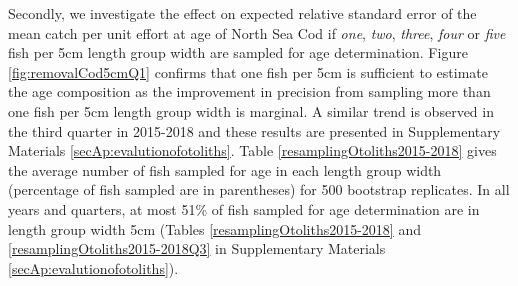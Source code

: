\documentclass[a4paper 12pt]{article}
\numberwithin{equation}{section}
\begin{document}
Secondly,  we investigate the effect on expected relative standard error of the mean catch per unit effort at age of North Sea Cod if \textit{one}, \textit{two}, \textit{three}, \textit{four} or \textit{five} fish per 5cm length group width are sampled for age determination. Figure  \ref{fig:removalCod5cmQ1} confirms that one fish per 5cm is sufficient to estimate the age composition as the improvement in precision from sampling more than one fish per 5cm length group width is marginal. A similar trend is observed in the third quarter in 2015-2018 and these results are presented  in Supplementary Materials \ref{secAp:evalutionofotoliths}. Table \ref{resamplingOtoliths2015-2018} gives the average number of fish sampled for age in each length group width (percentage of fish sampled are in parentheses) for 500 bootstrap replicates. In all years and quarters, at most 51\% of fish sampled for age determination are in length group width 5cm (Tables \ref{resamplingOtoliths2015-2018} and \ref{resamplingOtoliths2015-2018Q3} in Supplementary Materials \ref{secAp:evalutionofotoliths}). \\
\end{document}
